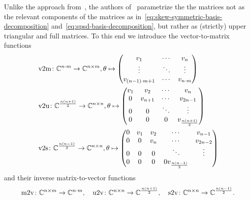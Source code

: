 
Unlike the approach from~\cite{Najnudel2021}, the authors of~\cite{Schwerdtner2021, SV2021, Schwerdtner2022, Schwerdtner2023} parametrize the the matrices not as the relevant components of the matrices as in~\eqref{eq:skew-symmetric-basis-decomposition} and~\eqref{eq:spsd-basis-decomposition}, but rather as (strictly) upper triangular and full matrices.
To this end we introduce the vector-to-matrix functions
\begin{align}
    &\mathop{}\!\mathrm{v}2\mathrm{m} \colon \mathbb{C}^{n \cdot m} \to \mathbb{C}^{n \times m}, \theta \mapsto \begin{pmatrix}
        v_1 & \cdots & v_n \\
        \vdots & \ddots & \vdots \\
        v_{(n - 1) \cdot m + 1} & \cdots & v_{n \cdot m}
    \end{pmatrix} \label{eq:v2m}\\
    &\mathop{}\!\mathrm{v}2\mathrm{u} \colon \mathbb{C}^{\frac{n (n + 1)}{2}} \to \mathbb{C}^{n \times n}, \theta \mapsto \begin{pmatrix}
        v_1 & v_2 & \cdots & v_n \\
        0 & v_{n + 1} & \cdots & v_{2n - 1} \\
        0 & 0 & \ddots & \vdots \\
        0 & 0 & 0 & v_{\frac{n (n + 1)}{2}}
    \end{pmatrix} \label{eq:v2u}\\
    &\mathop{}\!\mathrm{v}2\mathrm{s} \colon \mathbb{C}^{\frac{n (n - 1)}{2}} \to \mathbb{C}^{n \times n}, \theta \mapsto \begin{pmatrix}
        0 & v_1 & v_2 & \cdots & v_{n - 1} \\
        0 & 0 & v_n & \cdots & v_{2n - 2} \\
        0 & 0 & 0 & \ddots & \vdots \\
        0 & 0 & 0 & 0 v_{\frac{n (n - 1)}{2}}
    \end{pmatrix} \label{eq:v2s}
\end{align}
and their inverse matrix-to-vector functions
\begin{equation*}
    \mathop{}\!\mathrm{m}2\mathrm{v} \colon \mathbb{C}^{n \times m} \to \mathbb{C}^{n \cdot m},\quad \mathop{}\!\mathrm{u}2\mathrm{v} \colon \mathbb{C}^{n \times n} \to \mathbb{C}^{\frac{n (n + 1)}{2}},\quad \mathop{}\!\mathrm{s}2\mathrm{v} \colon \mathbb{C}^{n \times n} \to \mathbb{C}^{\frac{n (n - 1)}{2}}.
\end{equation*}

